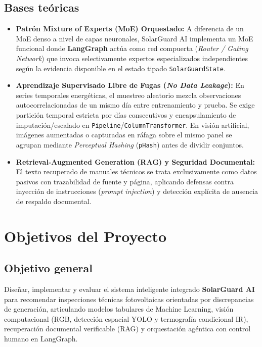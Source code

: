 \documentclass[12pt,a4paper]{article}
\begin{document}
\subsection{Bases teóricas}
\begin{itemize}
    \item \textbf{Patrón Mixture of Experts (MoE) Orquestado:} A diferencia de un MoE denso a nivel de capas neuronales, SolarGuard AI implementa un MoE funcional donde \textbf{LangGraph} actúa como red compuerta (\textit{Router / Gating Network}) que invoca selectivamente expertos especializados independientes según la evidencia disponible en el estado tipado \texttt{SolarGuardState}.
    \item \textbf{Aprendizaje Supervisado Libre de Fugas (\textit{No Data Leakage}):} En series temporales energéticas, el muestreo aleatorio mezcla observaciones autocorrelacionadas de un mismo día entre entrenamiento y prueba. Se exige partición temporal estricta por días consecutivos y encapsulamiento de imputación/escalado en \texttt{Pipeline}/\texttt{ColumnTransformer}. En visión artificial, imágenes aumentadas o capturadas en ráfaga sobre el mismo panel se agrupan mediante \textit{Perceptual Hashing} (\texttt{pHash}) antes de dividir conjuntos.
    \item \textbf{Retrieval-Augmented Generation (RAG) y Seguridad Documental:} El texto recuperado de manuales técnicos se trata exclusivamente como datos pasivos con trazabilidad de fuente y página, aplicando defensas contra inyección de instrucciones (\textit{prompt injection}) y detección explícita de ausencia de respaldo documental.
\end{itemize}

\section{Objetivos del Proyecto}

\subsection{Objetivo general}
Diseñar, implementar y evaluar el sistema inteligente integrado \textbf{SolarGuard AI} para recomendar inspecciones técnicas fotovoltaicas orientadas por discrepancias de generación, articulando modelos tabulares de Machine Learning, visión computacional (RGB, detección espacial YOLO y termografía condicional IR), recuperación documental verificable (RAG) y orquestación agéntica con control humano en LangGraph.
\end{document}
